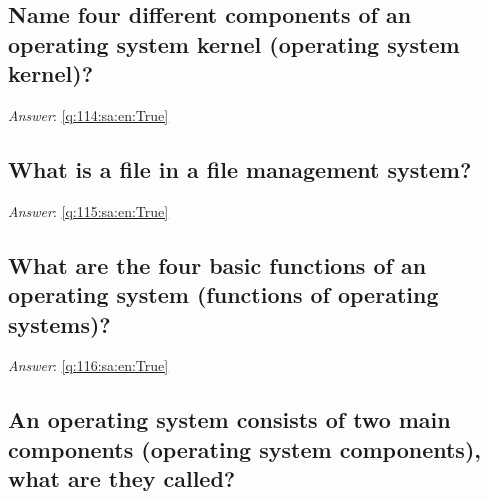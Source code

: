 \documentclass[a4paper,11pt,oneside]{article}
\begin{document}
\begin{sloppypar}
\subsection{Name four different components of an operating system kernel (operating system kernel)?}

\label{q:114:sa:en:False}

\vspace{2cm}

\noindent\makebox[\textwidth]{\hrulefill}

\vspace{1cm}

\textit{Answer}: \autoref{q:114:sa:en:True}



\subsection{What is a file in a file management system?}

\label{q:115:sa:en:False}

\vspace{2cm}

\noindent\makebox[\textwidth]{\hrulefill}

\vspace{1cm}

\textit{Answer}: \autoref{q:115:sa:en:True}



\subsection{What are the four basic functions of an operating system (functions of operating systems)?}

\label{q:116:sa:en:False}

\vspace{2cm}

\noindent\makebox[\textwidth]{\hrulefill}

\vspace{1cm}

\textit{Answer}: \autoref{q:116:sa:en:True}



\subsection{An operating system consists of two main components (operating system components), what are they called?}

\label{q:118:sa:en:False}


\end{sloppypar}
\end{document}
